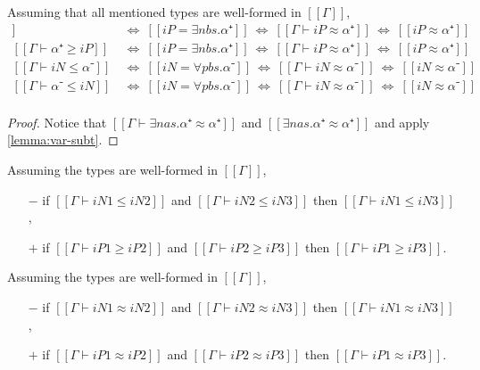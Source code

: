 \begin{corollary}
  \label{corollary:vars-no-proper-subtypes}
  Assuming that all mentioned types are well-formed in $[[Γ]]$,
  \begin{align*}
    [[Γ ⊢ iP ≥ α⁺]] ~ &\iff ~ [[iP = ∃nbs.α⁺]]  ~ \iff ~ [[Γ ⊢ iP ≈ α⁺]] ~ \iff ~ [[iP ≈ α⁺]]\\
    [[Γ ⊢ α⁺≥ iP]]  ~ &\iff ~ [[iP = ∃nbs.α⁺]]  ~ \iff ~ [[Γ ⊢ iP ≈ α⁺]] ~ \iff ~ [[iP ≈ α⁺]]\\
    [[Γ ⊢ iN ≤ α⁻]] ~ &\iff ~ [[iN = ∀pbs.α⁻]]  ~ \iff ~ [[Γ ⊢ iN ≈ α⁻]] ~ \iff ~ [[iN ≈ α⁻]]\\
    [[Γ ⊢ α⁻ ≤ iN]] ~ &\iff ~ [[iN = ∀pbs.α⁻]]  ~ \iff ~ [[Γ ⊢ iN ≈ α⁻]] ~ \iff ~ [[iN ≈ α⁻]]\\
  \end{align*}
\end{corollary}
\begin{proof}
  Notice that $[[Γ ⊢ ∃nas.α⁺ ≈ α⁺]]$ and $[[∃nas.α⁺ ≈ α⁺]]$ and apply
  \cref{lemma:var-subt}.
\end{proof}


\begin{lemma}
  
\end{lemma}

\begin{corollary} \label{corollary:subtyping-transitivity}
  Assuming the types are well-formed in $[[Γ]]$,
  \begin{itemize}
    \item[$-$] if $[[Γ ⊢ iN1 ≤ iN2]]$ and $[[Γ ⊢ iN2 ≤ iN3]]$ then $[[Γ ⊢ iN1 ≤ iN3]]$,
    \item[$+$] if $[[Γ ⊢ iP1 ≥ iP2]]$ and $[[Γ ⊢ iP2 ≥ iP3]]$ then $[[Γ ⊢ iP1 ≥ iP3]]$.
  \end{itemize}
\end{corollary}


\begin{corollary} \label{corollary:equivalence-transitivity}
  Assuming the types are well-formed in $[[Γ]]$,
  \begin{itemize}
    \item[$-$] if $[[Γ ⊢ iN1 ≈ iN2]]$ and $[[Γ ⊢ iN2 ≈ iN3]]$ then $[[Γ ⊢ iN1 ≈ iN3]]$,
    \item[$+$] if $[[Γ ⊢ iP1 ≈ iP2]]$ and $[[Γ ⊢ iP2 ≈ iP3]]$ then $[[Γ ⊢ iP1 ≈ iP3]]$.
  \end{itemize}
\end{corollary}








